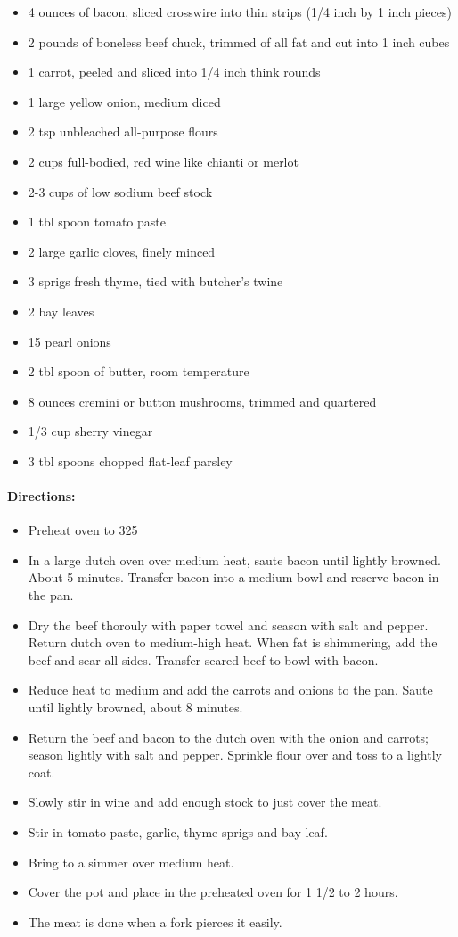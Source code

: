 \documentclass{article}
\begin{document}
\begin{itemize}
	\item 4 ounces of bacon, sliced crosswire into thin strips (1/4 inch by 1 inch pieces)
	\item 2 pounds of boneless beef chuck, trimmed of all fat and cut into 1 inch cubes
	\item 1 carrot, peeled and sliced into 1/4 inch think rounds
	\item 1 large yellow onion, medium diced
	\item 2 tsp unbleached all-purpose flours
	\item 2 cups full-bodied, red wine like chianti or merlot
	\item 2-3 cups of low sodium beef stock
	\item 1 tbl spoon tomato paste
	\item 2 large garlic cloves, finely minced
	\item 3 sprigs fresh thyme, tied with butcher's twine
	\item 2 bay leaves
	\item 15 pearl onions
	\item 2 tbl spoon of butter, room temperature
	\item 8 ounces cremini or button mushrooms, trimmed and quartered
	\item 1/3 cup sherry vinegar
	\item 3 tbl spoons chopped flat-leaf parsley
\end{itemize}

\paragraph{Directions:}
\begin{itemize}
\item Preheat oven to 325
\item In a large dutch oven over medium heat, saute bacon until lightly browned. About 5 minutes. Transfer bacon into a medium bowl and reserve bacon in the pan.
\item Dry the beef thorouly with paper towel and season with salt and pepper. Return dutch oven to medium-high heat. When fat is shimmering, add the beef and sear all sides. Transfer seared beef to bowl with bacon.
\item Reduce heat to medium and add the carrots and onions to the pan. Saute until lightly browned, about 8 minutes.
\item Return the beef and bacon to the dutch oven with the onion and carrots; season lightly with salt and pepper. Sprinkle flour over and toss to a lightly coat.
\item Slowly stir in wine and add enough stock to just cover the meat.
\item Stir in tomato paste, garlic, thyme sprigs and bay leaf.
\item Bring to a simmer over medium heat. 
\item Cover the pot and place in the preheated oven for 1 1/2 to 2 hours.
\item The meat is done when a fork pierces it easily.
\end{itemize}
\end{document}
